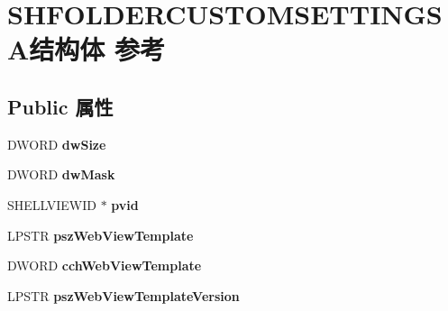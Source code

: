 \hypertarget{struct_s_h_f_o_l_d_e_r_c_u_s_t_o_m_s_e_t_t_i_n_g_s_a}{}\section{S\+H\+F\+O\+L\+D\+E\+R\+C\+U\+S\+T\+O\+M\+S\+E\+T\+T\+I\+N\+G\+S\+A结构体 参考}
\label{struct_s_h_f_o_l_d_e_r_c_u_s_t_o_m_s_e_t_t_i_n_g_s_a}
\subsection*{Public 属性}
\begin{DoxyCompactItemize}
\item 
\mbox{\label{struct_s_h_f_o_l_d_e_r_c_u_s_t_o_m_s_e_t_t_i_n_g_s_a_ace302b356a17a6bdc64089c5886f52c0}} 
D\+W\+O\+RD {\bfseries dw\+Size}
\item 
\mbox{\label{struct_s_h_f_o_l_d_e_r_c_u_s_t_o_m_s_e_t_t_i_n_g_s_a_ac31b38d95a7523d159ed797362c47a87}} 
D\+W\+O\+RD {\bfseries dw\+Mask}
\item 
\mbox{\label{struct_s_h_f_o_l_d_e_r_c_u_s_t_o_m_s_e_t_t_i_n_g_s_a_a8b21b84466229016405cc5c31feaddcd}} 
S\+H\+E\+L\+L\+V\+I\+E\+W\+ID $\ast$ {\bfseries pvid}
\item 
\mbox{\label{struct_s_h_f_o_l_d_e_r_c_u_s_t_o_m_s_e_t_t_i_n_g_s_a_a7b20906e2c269ad9644da1eded5de75c}} 
L\+P\+S\+TR {\bfseries psz\+Web\+View\+Template}
\item 
\mbox{\label{struct_s_h_f_o_l_d_e_r_c_u_s_t_o_m_s_e_t_t_i_n_g_s_a_aac5032cb5e810ec5d2259ddcad81f00e}} 
D\+W\+O\+RD {\bfseries cch\+Web\+View\+Template}
\item 
\mbox{\label{struct_s_h_f_o_l_d_e_r_c_u_s_t_o_m_s_e_t_t_i_n_g_s_a_a814b17c8fe8041169ce2fc73e80de950}} 
L\+P\+S\+TR {\bfseries psz\+Web\+View\+Template\+Version}
\item 
\mbox{\label{struct_s_h_f_o_l_d_e_r_c_u_s_t_o_m_s_e_t_t_i_n_g_s_a_a83d1703faeaca796dde0b751cceb3157}} 

\end{DoxyCompactItemize}
